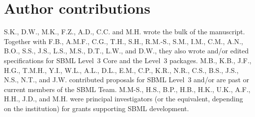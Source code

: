 \documentclass{sbml-paper}
\begin{document}
\section{Author contributions}

S.K., D.W., M.K., F.Z., A.D., C.C. and M.H. wrote the bulk of the manuscript.  Together with F.B., A.M.F., C.G., T.H., S.H., R.M.-S., S.M., I.M., C.M., A.N., B.O., S.S., J.S., L.S., M.S., D.T., L.W., and D.W., they also wrote and/or edited specifications for SBML Level~3 Core and the Level~3 packages.  M.B., K.B., J.F., H.G., T.M.H., Y.I., W.L., A.L., D.L., E.M., C.P., K.R., N.R., C.S., B.S., J.S., N.S., N.T., and J.W. contributed proposals for SBML Level~3 and/or are past or current members of the SBML Team.  M.M-S., H.S., B.P., H.B., H.K., U.K., A.F., H.H., J.D., and M.H. were principal investigators (or the equivalent, depending on the institution) for grants supporting SBML development.



\clearpage



\end{document}
